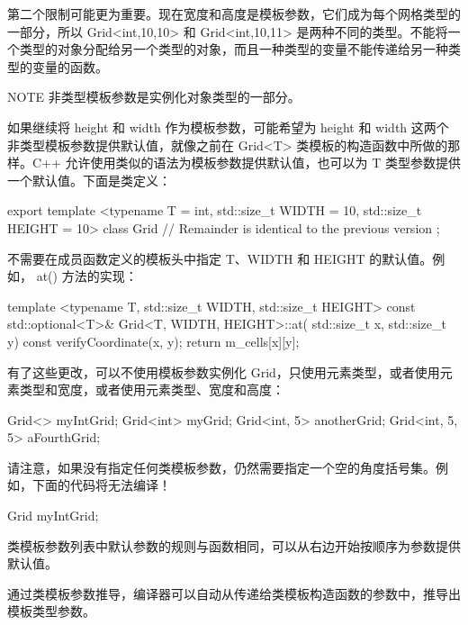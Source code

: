 第二个限制可能更为重要。现在宽度和高度是模板参数，它们成为每个网格类型的一部分，所以 Grid<int,10,10> 和 Grid<int,10,11> 是两种不同的类型。不能将一个类型的对象分配给另一个类型的对象，而且一种类型的变量不能传递给另一种类型的变量的函数。

\begin{myNotic}{NOTE}
非类型模板参数是实例化对象类型的一部分。
\end{myNotic}


如果继续将 height 和 width 作为模板参数，可能希望为 height 和 width 这两个非类型模板参数提供默认值，就像之前在 Grid<T> 类模板的构造函数中所做的那样。C++ 允许使用类似的语法为模板参数提供默认值，也可以为 T 类型参数提供一个默认值。下面是类定义：

\begin{cpp}
export template <typename T = int, std::size_t WIDTH = 10, std::size_t HEIGHT = 10>
class Grid
{
    // Remainder is identical to the previous version
};
\end{cpp}

不需要在成员函数定义的模板头中指定 T、WIDTH 和 HEIGHT 的默认值。例如， at() 方法的实现：

\begin{cpp}
template <typename T, std::size_t WIDTH, std::size_t HEIGHT>
const std::optional<T>& Grid<T, WIDTH, HEIGHT>::at(
    std::size_t x, std::size_t y) const
{
    verifyCoordinate(x, y);
    return m_cells[x][y];
}
\end{cpp}

有了这些更改，可以不使用模板参数实例化 Grid，只使用元素类型，或者使用元素类型和宽度，或者使用元素类型、宽度和高度：

\begin{cpp}
Grid<> myIntGrid;
Grid<int> myGrid;
Grid<int, 5> anotherGrid;
Grid<int, 5, 5> aFourthGrid;
\end{cpp}

请注意，如果没有指定任何类模板参数，仍然需要指定一个空的角度括号集。例如，下面的代码将无法编译！

\begin{cpp}
Grid myIntGrid;
\end{cpp}

类模板参数列表中默认参数的规则与函数相同，可以从右边开始按顺序为参数提供默认值。


通过类模板参数推导，编译器可以自动从传递给类模板构造函数的参数中，推导出模板类型参数。

